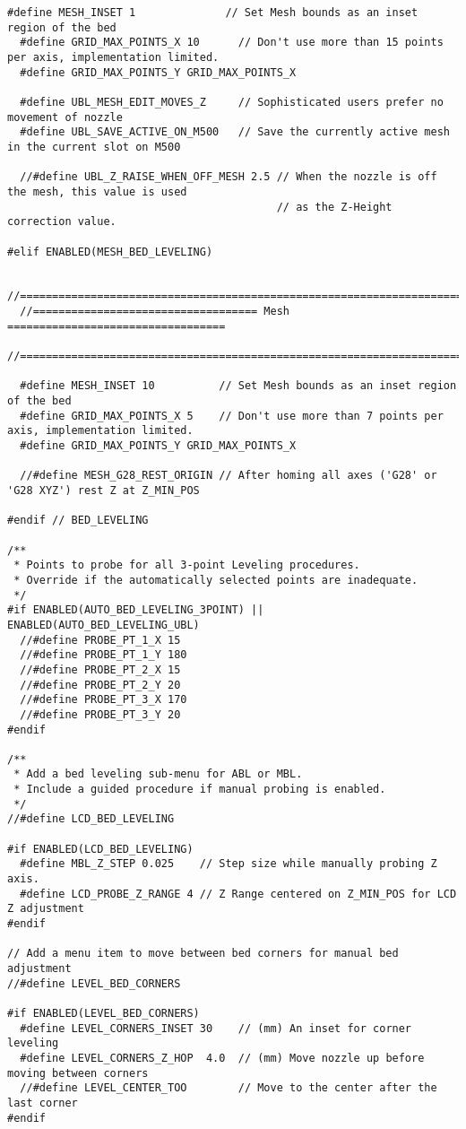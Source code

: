 \begin{lstlisting}[caption = キャプション, label = ラベル]
  #define MESH_INSET 1              // Set Mesh bounds as an inset region of the bed
  #define GRID_MAX_POINTS_X 10      // Don't use more than 15 points per axis, implementation limited.
  #define GRID_MAX_POINTS_Y GRID_MAX_POINTS_X

  #define UBL_MESH_EDIT_MOVES_Z     // Sophisticated users prefer no movement of nozzle
  #define UBL_SAVE_ACTIVE_ON_M500   // Save the currently active mesh in the current slot on M500

  //#define UBL_Z_RAISE_WHEN_OFF_MESH 2.5 // When the nozzle is off the mesh, this value is used
                                          // as the Z-Height correction value.

#elif ENABLED(MESH_BED_LEVELING)

  //===========================================================================
  //=================================== Mesh ==================================
  //===========================================================================

  #define MESH_INSET 10          // Set Mesh bounds as an inset region of the bed
  #define GRID_MAX_POINTS_X 5    // Don't use more than 7 points per axis, implementation limited.
  #define GRID_MAX_POINTS_Y GRID_MAX_POINTS_X

  //#define MESH_G28_REST_ORIGIN // After homing all axes ('G28' or 'G28 XYZ') rest Z at Z_MIN_POS

#endif // BED_LEVELING

/**
 * Points to probe for all 3-point Leveling procedures.
 * Override if the automatically selected points are inadequate.
 */
#if ENABLED(AUTO_BED_LEVELING_3POINT) || ENABLED(AUTO_BED_LEVELING_UBL)
  //#define PROBE_PT_1_X 15
  //#define PROBE_PT_1_Y 180
  //#define PROBE_PT_2_X 15
  //#define PROBE_PT_2_Y 20
  //#define PROBE_PT_3_X 170
  //#define PROBE_PT_3_Y 20
#endif

/**
 * Add a bed leveling sub-menu for ABL or MBL.
 * Include a guided procedure if manual probing is enabled.
 */
//#define LCD_BED_LEVELING

#if ENABLED(LCD_BED_LEVELING)
  #define MBL_Z_STEP 0.025    // Step size while manually probing Z axis.
  #define LCD_PROBE_Z_RANGE 4 // Z Range centered on Z_MIN_POS for LCD Z adjustment
#endif

// Add a menu item to move between bed corners for manual bed adjustment
//#define LEVEL_BED_CORNERS

#if ENABLED(LEVEL_BED_CORNERS)
  #define LEVEL_CORNERS_INSET 30    // (mm) An inset for corner leveling
  #define LEVEL_CORNERS_Z_HOP  4.0  // (mm) Move nozzle up before moving between corners
  //#define LEVEL_CENTER_TOO        // Move to the center after the last corner
#endif


\end{lstlisting}

